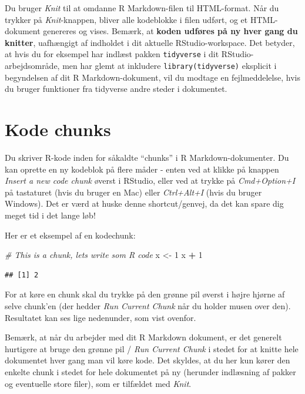 \documentclass[
]{book}
\newenvironment{Shaded}{\begin{snugshade}}{\end{snugshade}}
\newcommand{\CommentTok}[1]{\textcolor[rgb]{0.56,0.35,0.01}{\textit{#1}}}
\newcommand{\DecValTok}[1]{\textcolor[rgb]{0.00,0.00,0.81}{#1}}
\newcommand{\NormalTok}[1]{#1}
\newcommand{\OtherTok}[1]{\textcolor[rgb]{0.56,0.35,0.01}{#1}}
\newcommand{\SpecialCharTok}[1]{\textcolor[rgb]{0.81,0.36,0.00}{\textbf{#1}}}
\begin{document}
Du bruger \emph{Knit} til at omdanne R Markdown-filen til HTML-format. Når du trykker på \emph{Knit}-knappen, bliver alle kodeblokke i filen udført, og et HTML-dokument genereres og vises. Bemærk, at \textbf{koden udføres på ny hver gang du knitter}, uafhængigt af indholdet i dit aktuelle RStudio-workspace. Det betyder, at hvis du for eksempel har indlæst pakken \texttt{tidyverse} i dit RStudio-arbejdsområde, men har glemt at inkludere \texttt{library(tidyverse)} eksplicit i begyndelsen af dit R Markdown-dokument, vil du modtage en fejlmeddelelse, hvis du bruger funktioner fra tidyverse andre steder i dokumentet.

\section{Kode chunks}\label{kode-chunks}

Du skriver R-kode inden for såkaldte ``chunks'' i R Markdown-dokumenter. Du kan oprette en ny kodeblok på flere måder - enten ved at klikke på knappen \emph{Insert a new code chunk} øverst i RStudio, eller ved at trykke på \emph{Cmd+Option+I} på tastaturet (hvis du bruger en Mac) eller \emph{Ctrl+Alt+I} (hvis du bruger Windows). Det er værd at huske denne shortcut/genvej, da det kan spare dig meget tid i det lange løb!

Her er et eksempel af en kodechunk:

\begin{Shaded}
\begin{Highlighting}[]
\CommentTok{\# This is a chunk, let\textquotesingle{}s write som R code}
\NormalTok{x }\OtherTok{\textless{}{-}} \DecValTok{1}
\NormalTok{x }\SpecialCharTok{+} \DecValTok{1}
\end{Highlighting}
\end{Shaded}

\begin{verbatim}
## [1] 2
\end{verbatim}

For at køre en chunk skal du trykke på den grønne pil øverst i højre hjørne af selve chunk'en (der hedder \emph{Run Current Chunk} når du holder musen over den). Resultatet kan ses lige nedenunder, som vist ovenfor.

Bemærk, at når du arbejder med dit R Markdown dokument, er det generelt hurtigere at bruge den grønne pil / \emph{Run Current Chunk} i stedet for at knitte hele dokumentet hver gang man vil køre kode. Det skyldes, at du her kun kører den enkelte chunk i stedet for hele dokumentet på ny (herunder indlæsning af pakker og eventuelle store filer), som er tilfældet med \emph{Knit}.
\end{document}
